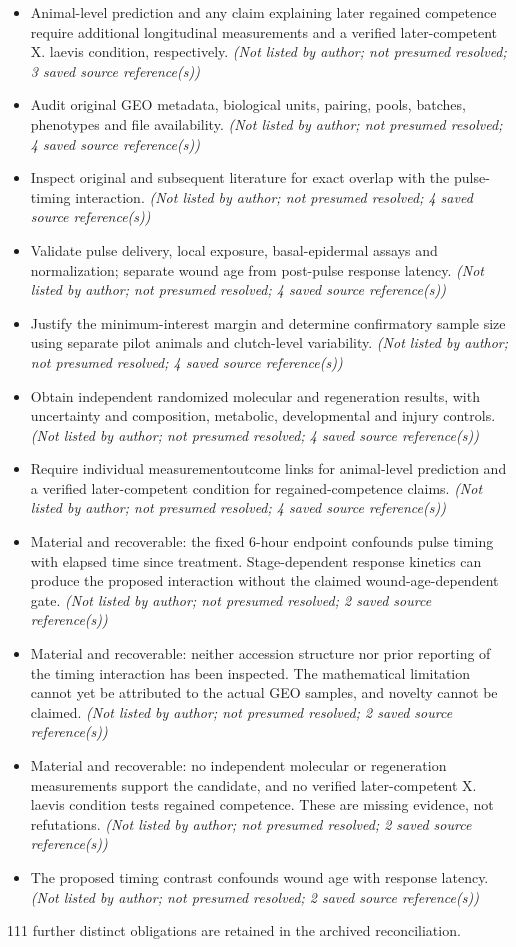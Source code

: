 \documentclass[11pt]{article}
\begin{document}
\begin{itemize}
\item Animal-level prediction and any claim explaining later regained competence require additional longitudinal measurements and a verified later-competent X. laevis condition, respectively. \textit{ (Not listed by author; not presumed resolved; 3 saved source reference(s))}
\item Audit original GEO metadata, biological units, pairing, pools, batches, phenotypes and file availability. \textit{ (Not listed by author; not presumed resolved; 4 saved source reference(s))}
\item Inspect original and subsequent literature for exact overlap with the pulse-timing interaction. \textit{ (Not listed by author; not presumed resolved; 4 saved source reference(s))}
\item Validate pulse delivery, local exposure, basal-epidermal assays and normalization; separate wound age from post-pulse response latency. \textit{ (Not listed by author; not presumed resolved; 4 saved source reference(s))}
\item Justify the minimum-interest margin and determine confirmatory sample size using separate pilot animals and clutch-level variability. \textit{ (Not listed by author; not presumed resolved; 4 saved source reference(s))}
\item Obtain independent randomized molecular and regeneration results, with uncertainty and composition, metabolic, developmental and injury controls. \textit{ (Not listed by author; not presumed resolved; 4 saved source reference(s))}
\item Require individual measurement\textendash{}outcome links for animal-level prediction and a verified later-competent condition for regained-competence claims. \textit{ (Not listed by author; not presumed resolved; 4 saved source reference(s))}
\item Material and recoverable: the fixed 6-hour endpoint confounds pulse timing with elapsed time since treatment. Stage-dependent response kinetics can produce the proposed interaction without the claimed wound-age-dependent gate. \textit{ (Not listed by author; not presumed resolved; 2 saved source reference(s))}
\item Material and recoverable: neither accession structure nor prior reporting of the timing interaction has been inspected. The mathematical limitation cannot yet be attributed to the actual GEO samples, and novelty cannot be claimed. \textit{ (Not listed by author; not presumed resolved; 2 saved source reference(s))}
\item Material and recoverable: no independent molecular or regeneration measurements support the candidate, and no verified later-competent X. laevis condition tests regained competence. These are missing evidence, not refutations. \textit{ (Not listed by author; not presumed resolved; 2 saved source reference(s))}
\item The proposed timing contrast confounds wound age with response latency. \textit{ (Not listed by author; not presumed resolved; 2 saved source reference(s))}
\end{itemize}
111 further distinct obligations are retained in the archived reconciliation.
\end{document}
